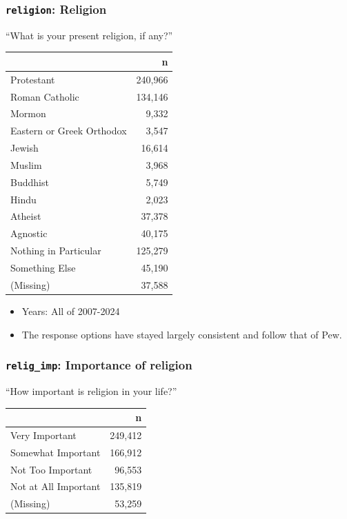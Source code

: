 \documentclass[10pt,article,oneside]{memoir}
\begin{document}
\subsubsection{\texorpdfstring{\texttt{religion}:
Religion}{religion: Religion}}\label{religion-religion}

``What is your present religion, if any?''

\begin{table}[H]
\centering
\begin{tabular}[t]{lr}
\toprule
 & n\\
\midrule
Protestant & 240,966\\
Roman Catholic & 134,146\\
Mormon & 9,332\\
Eastern or Greek Orthodox & 3,547\\
Jewish & 16,614\\
Muslim & 3,968\\
Buddhist & 5,749\\
Hindu & 2,023\\
Atheist & 37,378\\
Agnostic & 40,175\\
Nothing in Particular & 125,279\\
Something Else & 45,190\\
(Missing) & 37,588\\
\bottomrule
\end{tabular}
\end{table}

\begin{itemize}
\tightlist
\item
  Years: All of 2007-2024
\item
  The response options have stayed largely consistent and follow that of
  Pew.
\end{itemize}

\subsubsection{\texorpdfstring{\texttt{relig\_imp}: Importance of
religion}{relig\_imp: Importance of religion}}\label{relig_imp-importance-of-religion}

``How important is religion in your life?''

\begin{table}[H]
\centering
\begin{tabular}[t]{lr}
\toprule
 & n\\
\midrule
Very Important & 249,412\\
Somewhat Important & 166,912\\
Not Too Important & 96,553\\
Not at All Important & 135,819\\
(Missing) & 53,259\\
\bottomrule
\end{tabular}
\end{table}
\end{document}
